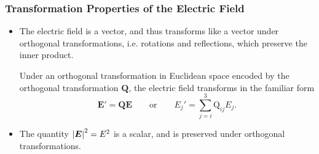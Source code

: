 \documentclass[11pt, a4paper]{article}
\renewcommand{\vec}[1]{\bm{#1}} %
\newcommand{\mat}[1]{\mathbf{#1}} %
\newcommand{\E}{\vec{E}} %
\begin{document}
\subsubsection{Transformation Properties of the Electric Field}
\begin{itemize}
    \item The electric field is a vector, and thus transforms like a vector under orthogonal transformations, i.e. rotations and reflections, which preserve the inner product. 

    Under an orthogonal transformation in Euclidean space encoded by the orthogonal transformation $ \mat{Q} $, the electric field transforms in the familiar form
    \begin{equation*}
        \E' = \mat{Q} \E \qquad \text{or} \qquad E_{j}' = \sum_{j = i}^{3} \mathrm{Q}_{ij}E_{j}.
    \end{equation*}

    \item The quantity $ \abs{\E}^{2} = E^{2} $ is a scalar, and is preserved under orthogonal transformations.
    
\end{itemize}
\end{document}
